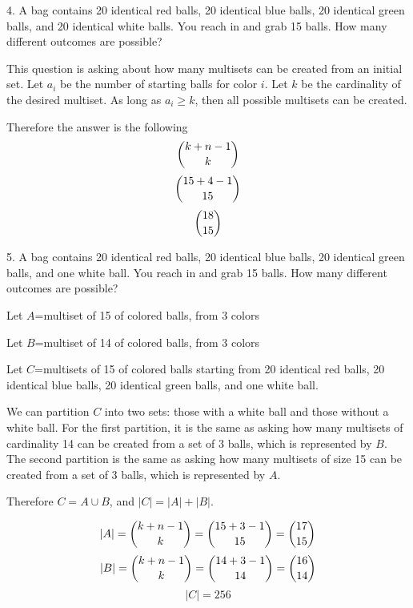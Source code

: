 \documentclass{idrisMemo}
\begin{document}
\begin{prooflist}{4. A bag contains 20 identical red balls, 20 identical blue
    balls, 20 identical green balls, and 20 identical white balls. You reach in
    and grab 15 balls. How many different outcomes are possible?}
    \item This question is asking about how many multisets can be created from
        an initial set. Let $a_i$ be the number of starting balls for color $i$.
        Let $k$ be the cardinality of the desired multiset. As long as $a_i\geq k$,
        then all possible multisets can be created.
    \item Therefore the answer is the following
        $$ \dbinom{k+n-1}{k} $$
        $$ \dbinom{15+4-1}{15}$$
        $$ \dbinom{18}{15}$$
\item
\end{prooflist}

\begin{prooflist}{5. A bag contains 20 identical red balls, 20 identical blue balls, 20 identical green balls, and one white ball. You reach in and grab 15 balls. How many different outcomes are possible?}
\item Let $A$=multiset of 15 of colored balls, from 3 colors
\item Let $B$=multiset of 14 of colored balls, from 3 colors
\item Let $C$=multisets of 15 of colored balls starting from 20
    identical red balls, 20 identical blue balls, 20 identical green balls, and
    one white ball.
\item We can partition $C$ into two sets: those with a white ball and those
    without a white ball. For the first partition, it is the same as asking how
    many multisets of cardinality 14 can be created from a set of 3 balls, which
    is represented by $B$. The second partition is the same as asking how many
    multisets of size 15 can be created from a set of 3 balls, which is
    represented by $A$.
\item Therefore $C=A \cup B$, and $|C| = |A| + |B|$.
\item
    $$ |A| = \dbinom{k+n-1}{k} = \dbinom{15+3-1}{15}=\dbinom{17}{15}$$
    $$ |B| = \dbinom{k+n-1}{k} = \dbinom{14+3-1}{14}=\dbinom{16}{14}$$
    $$ |C| = 256 $$
\item
\end{prooflist}
\end{document}
